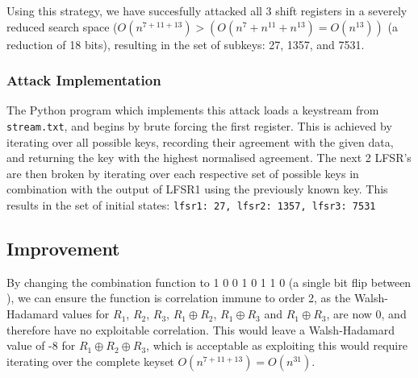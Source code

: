 \documentclass[british,11pt,a4paper]{article}
\begin{document}
Using this strategy, we have succesfully attacked all 3 shift registers in a severely reduced search space (\(O(n^{7+11+13})>(O(n^{7}+n^{11}+n^{13})=O(n^{13}))\) (a reduction of 18 bits), resulting in the set of subkeys: 27, 1357, and 7531.

\subsubsection{Attack Implementation}
The Python program which implements this attack loads a keystream from \lstinline{stream.txt}, and begins by brute forcing the first register.
This is achieved by iterating over all possible keys, recording their agreement with the given data, and returning the key with the highest normalised agreement.
The next 2 LFSR's are then broken by iterating over each respective set of possible keys in combination with the output of LFSR1 using the previously known key.
This results in the set of initial states: \lstinline{lfsr1: 27, lfsr2: 1357, lfsr3: 7531}

\subsection{Improvement}
By changing the combination function to 1 0 0 1 0 1 1 0 (a single bit flip between ), we can ensure the function
is correlation immune to order 2, as the Walsh-Hadamard values for \(R_1\),
 \(R_2\),  \(R_3\),  \(R_1 \oplus R_2\), \(R_1 \oplus R_3\) and \(R_1 \oplus R_3\), are now 0,
 and therefore have no exploitable correlation. This would leave a Walsh-Hadamard value of
 -8 for \(R_1 \oplus R_2 \oplus R_3\), which is acceptable as exploiting this would require iterating over the complete keyset \(O(n^{7+11+13}) = O(n^{31})\).
\end{document}
